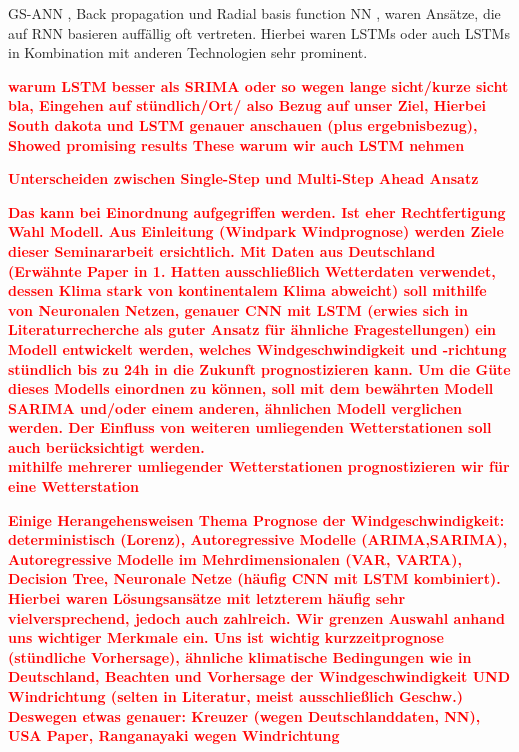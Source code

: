 \documentclass[
12pt, %
toc=listofnumbered, %
toc=chapterentrydotfill, %
numbers=noenddot, %
captions=tableheading, %
bibliography=numbered
]{scrreprt}
\newcommand{\highlight}[1]{\textbf{\textcolor{red}{#1}}}
\begin{document}
GS-ANN \cite{2019_Khodayar_IntervalDeepGenerative}, Back propagation \cite{2012_Wang_ShorttermWindSpeed} und Radial basis function NN \cite{2017_Chang_ImprovedNeuralNetworkbased}, 
waren Ansätze, die auf RNN basieren auffällig oft vertreten. Hierbei waren LSTMs \cite{2018_Dong_WindPowerPrediction,2020_Delgado_WindTurbineData,2020_Moharm_WindSpeedForecast,2019_Prabha_WindSpeedForecasting,2019_Cali_ShorttermWindPower} oder auch LSTMs in Kombination mit 
anderen Technologien \cite{2019_Chen_MultifactorSpatiotemporalCorrelation,2016_Allende_RecurrentNetworksWind,2018_Liu_WindSpeedForecasting,2018_Yao_MultidimensionalLSTMNetworks} sehr prominent. 


\highlight{warum LSTM besser als SRIMA oder so wegen lange sicht/kurze sicht bla, Eingehen auf stündlich/Ort/ also Bezug auf 
unser Ziel, Hierbei South dakota und LSTM genauer anschauen (plus ergebnisbezug), Showed promising results These warum wir auch 
LSTM nehmen}

\highlight{Unterscheiden zwischen Single-Step und Multi-Step Ahead Ansatz}

\highlight{ Das kann bei Einordnung aufgegriffen werden. Ist eher Rechtfertigung Wahl Modell.
	Aus Einleitung (Windpark Windprognose) werden Ziele dieser Seminararbeit ersichtlich. 
Mit Daten aus Deutschland (Erwähnte Paper in 1. Hatten ausschließlich Wetterdaten verwendet, dessen Klima stark von kontinentalem Klima abweicht) 
soll mithilfe von Neuronalen Netzen, genauer CNN mit LSTM (erwies sich in Literaturrecherche als guter Ansatz für ähnliche Fragestellungen) ein 
Modell entwickelt werden, welches Windgeschwindigkeit und -richtung stündlich bis zu 24h in die Zukunft prognostizieren kann. 
Um die Güte dieses Modells einordnen zu können, soll mit dem bewährten Modell SARIMA und/oder einem anderen, ähnlichen Modell verglichen werden. 
Der Einfluss von weiteren umliegenden Wetterstationen soll auch berücksichtigt werden.} \\

\highlight{mithilfe mehrerer umliegender Wetterstationen prognostizieren wir für eine Wetterstation}

\highlight{Einige Herangehensweisen Thema Prognose der Windgeschwindigkeit: 
deterministisch (Lorenz), Autoregressive Modelle (ARIMA,SARIMA), Autoregressive Modelle im Mehrdimensionalen (VAR, VARTA), 
Decision Tree,  Neuronale Netze (häufig CNN mit LSTM kombiniert). 
Hierbei waren Lösungsansätze mit letzterem häufig sehr vielversprechend, jedoch auch zahlreich.
Wir grenzen Auswahl anhand uns wichtiger Merkmale ein. 
Uns ist wichtig kurzzeitprognose (stündliche Vorhersage), ähnliche klimatische Bedingungen wie in Deutschland, Beachten und Vorhersage der Windgeschwindigkeit UND Windrichtung (selten in Literatur, meist ausschließlich Geschw.) 
Deswegen etwas genauer: Kreuzer (wegen Deutschlanddaten, NN), USA Paper, Ranganayaki wegen Windrichtung
}
\end{document}
